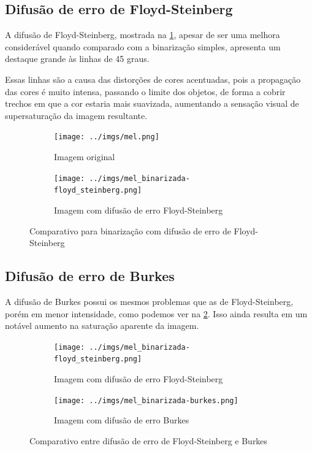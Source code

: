 \documentclass[brazilian,a4paper,twocolumn]{article}
\begin{document}
    \subsection{Difusão de erro de Floyd-Steinberg}

        A difusão de Floyd-Steinberg, mostrada na \cref{fig:binarizada-floyd_steinberg}, apesar de ser uma melhora considerável quando comparado com a binarização simples, apresenta um destaque grande às linhas de 45 graus.

        Essas linhas são a causa das distorções de cores acentuadas, pois a propagação das cores é muito intensa, passando o limite dos objetos, de forma a cobrir trechos em que a cor estaria mais suavizada, aumentando a sensação visual de supersaturação da imagem resultante.

        \begin{figure}
            \centering
            \begin{subfigure}{0.24\textwidth}
                \texttt{[image: ../imgs/mel.png]}
                \caption{Imagem original}
            \end{subfigure}
            \begin{subfigure}{0.24\textwidth}
                \texttt{[image: ../imgs/mel\_binarizada-floyd\_steinberg.png]}
                \caption{Imagem com difusão de erro Floyd-Steinberg}
            \end{subfigure}

            \caption{Comparativo para binarização com difusão de erro de Floyd-Steinberg}
            \label{fig:binarizada-floyd_steinberg}
        \end{figure}

    \subsection{Difusão de erro de Burkes}

        A difusão de Burkes possui os mesmos problemas que as de Floyd-Steinberg, porém em menor intensidade, como podemos ver na \cref{fig:binarizada-floyd_steinberg-burkes}. Isso ainda resulta em um notável aumento na saturação aparente da imagem.

        \begin{figure}
            \centering
            \begin{subfigure}{0.24\textwidth}
                \texttt{[image: ../imgs/mel\_binarizada-floyd\_steinberg.png]}
                \caption{Imagem com difusão de erro Floyd-Steinberg}
            \end{subfigure}
            \begin{subfigure}{0.24\textwidth}
                \texttt{[image: ../imgs/mel\_binarizada-burkes.png]}
                \caption{Imagem com difusão de erro Burkes}
            \end{subfigure}

            \caption{Comparativo entre difusão de erro de Floyd-Steinberg e Burkes}
            \label{fig:binarizada-floyd_steinberg-burkes}
        \end{figure}
\end{document}
